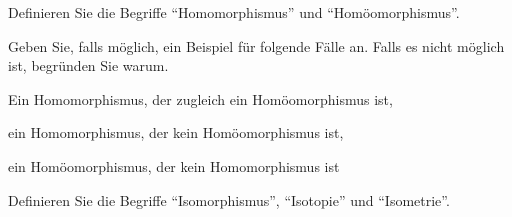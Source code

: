 \begin{aufgabe}[Begriffe]\label{ub3:meinsExtra}
    Definieren Sie die Begriffe \enquote{Homomorphismus} und
    \enquote{Homöomorphismus}.

    Geben Sie, falls möglich, ein Beispiel für folgende Fälle an.
    Falls es nicht möglich ist, begründen Sie warum.
    \begin{bspenum}
        \item Ein Homomorphismus, der zugleich ein Homöomorphismus ist,
        \item ein Homomorphismus, der kein Homöomorphismus ist,
        \item ein Homöomorphismus, der kein Homomorphismus ist
    \end{bspenum}
\end{aufgabe}

\begin{aufgabe}[Begriffe]\label{ub3:meinsExtra2}
    Definieren Sie die Begriffe \enquote{Isomorphismus},
    \enquote{Isotopie} und \enquote{Isometrie}.
\end{aufgabe}
